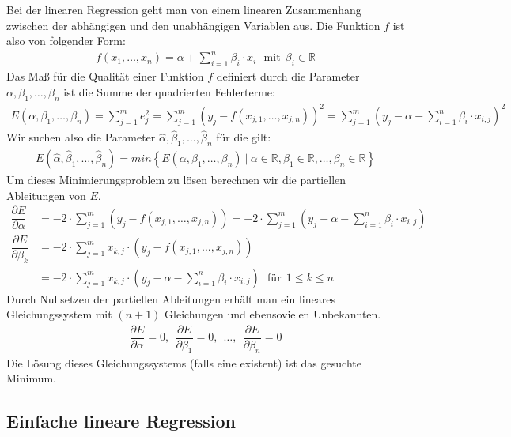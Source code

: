 Bei der linearen Regression geht man von einem linearen Zusammenhang zwischen der abhängigen und den unabhängigen Variablen aus. Die Funktion $f$ ist also von folgender Form:
\begin{align*}
    f(x_1, \dots, x_n) = \alpha + \sum_{i=1}^n \beta_i \cdot x_i ~~~ \text{mit} ~~ \beta_i \in \mathbb{R}
\end{align*}
Das Maß für die Qualität einer Funktion $f$ definiert durch die Parameter $\alpha, \beta_1, \dots, \beta_n$ ist die Summe der quadrierten Fehlerterme:
\begin{align*}
    E(\alpha, \beta_1, \dots, \beta_n) = \sum_{j=1}^m e_j^2 =  \sum_{j=1}^m \left( y_j - f(x_{j, 1}, \dots, x_{j, n}) \right)^2 = \sum_{j=1}^m \left( y_j - \alpha - \sum_{i=1}^n \beta_i \cdot x_{i, j} \right)^2
\end{align*}
Wir suchen also die Parameter $\hat\alpha, \hat\beta_1, \dots, \hat\beta_n$ für die gilt:
\begin{align*}
    E(\hat\alpha, \hat\beta_1, \dots, \hat\beta_n) = min \left\{E(\alpha, \beta_1, \dots, \beta_n) ~|~ \alpha \in \mathbb{R}, \beta_1 \in \mathbb{R}, \dots, \beta_n \in \mathbb{R} \right \}
\end{align*}
Um dieses Minimierungsproblem zu lösen berechnen wir die partiellen Ableitungen von $E$.
\begin{align*}
    \dfrac{\partial E}{\partial \alpha} &= - 2 \cdot \sum_{j=1}^m \left( y_j - f(x_{j, 1}, \dots, x_{j, n}) \right) = - 2 \cdot \sum_{j=1}^m \left( y_j - \alpha - \sum_{i=1}^n \beta_i \cdot x_{i, j} \right)\\
    \dfrac{\partial E}{\partial \beta_k} &= - 2 \cdot \sum_{j=1}^m x_{k, j} \cdot \left( y_j - f(x_{j, 1}, \dots, x_{j, n}) \right)\\
    &= - 2 \cdot \sum_{j=1}^m x_{k, j} \cdot \left( y_j - \alpha - \sum_{i=1}^n \beta_i \cdot x_{i, j} \right) ~~~\text{für}~~ 1 \leq k \leq n
\end{align*}
Durch Nullsetzen der partiellen Ableitungen erhält man ein lineares Gleichungssystem mit $(n + 1)$ Gleichungen und ebensovielen Unbekannten.
\begin{align*}
    \dfrac{\partial E}{\partial \alpha} = 0, ~~ \dfrac{\partial E}{\partial \beta_1} = 0, ~~ \dots, ~~ \dfrac{\partial E}{\partial \beta_n} = 0
\end{align*}
Die Lösung dieses Gleichungssystems (falls eine existent) ist das gesuchte Minimum.

\subsection{Einfache lineare Regression}

